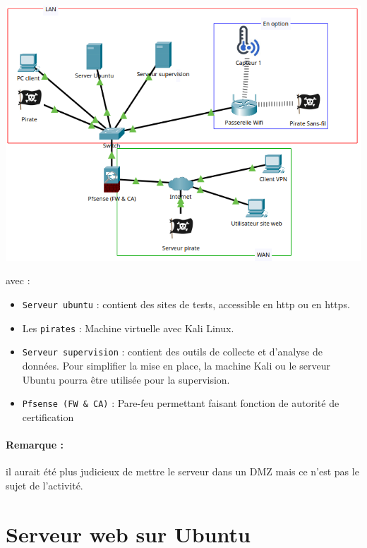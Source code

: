 \documentclass[french, 12pt]{article}%
\newcommand{\itemE}{\item[$\bullet$]}
\begin{document}
\begin{center}
\includegraphics[scale=0.7]{./ressource/environnement.png}
\end{center}
avec : 
\begin{itemize}
\itemE \verb?Serveur ubuntu? : contient des sites de tests, accessible en http ou en https. 
\itemE Les \verb?pirates? : Machine virtuelle avec Kali Linux.
\itemE \verb?Serveur supervision? : contient des outils de collecte et d'analyse de données. Pour simplifier la mise en place, la machine Kali ou le serveur Ubuntu pourra être utilisée pour la supervision.
\itemE \verb?Pfsense (FW & CA)? : Pare-feu permettant faisant fonction de autorité de certification
\end{itemize}

\paragraph{Remarque :} il aurait été plus judicieux de mettre le serveur dans un DMZ mais ce n'est pas le sujet de l'activité.  

\section{Serveur web sur Ubuntu}
\end{document}
